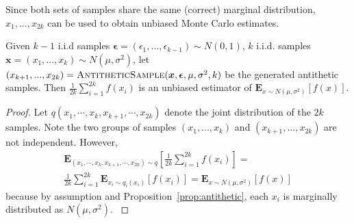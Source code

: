 Since both sets of samples share the same (correct) marginal distribution, $x_1, ..., x_{2k}$ can be used to obtain unbiased Monte Carlo estimates.
\begin{prop}
		Given $k - 1$ i.i.d samples $\boldsymbol{\epsilon} = (\epsilon_1, ..., \epsilon_{k-1}) \sim N(0, 1)$, $k$ i.i.d. samples $\boldsymbol{x} = (x_1, ..., x_k) \sim N(\mu, \sigma^2)$, let $(x_{k+1}, ..., x_{2k}) = \textsc{AntitheticSample}(\boldsymbol{x}, \boldsymbol{\epsilon}, \mu, \sigma^2, k)$ be the generated antithetic samples. Then $\frac{1}{2k} \sum_{i=1}^{2k} f(x_i)$ is an unbiased estimator of $\mathbf{E}_{x \sim N(\mu, \sigma^2)}[f(x)]$.
 \label{unbiased}
\end{prop}

\begin{proof}
Let $q(x_1, \cdots, x_k, x_{k+1}, \cdots, x_{2k})$ denote the joint distribution of the $2k$ samples. Note the two groups of samples $(x_1, ..., x_k)$ and $(x_{k+1}, ..., x_{2k})$ are not independent. However,
\begin{align*}
\mathbf{E}_{(x_1, \cdots, x_k, x_{k+1}, \cdots, x_{2k}) \sim q} \left[ \frac{1}{2k} \sum_{i=1}^{2k} f(x_i) \right] = \\
\frac{1}{2k} \sum_{i=1}^{2k} \mathbf{E}_{x_i \sim q_i(x_i)} \left[f(x_i) \right] = \mathbf{E}_{x \sim N(\mu, \sigma^2)}[f(x)]
\end{align*}
because by assumption and Proposition~\ref{prop:antithetic}, each $x_i$ is marginally distributed as $N(\mu, \sigma^2)$.
\label{prop:test}
\end{proof}


